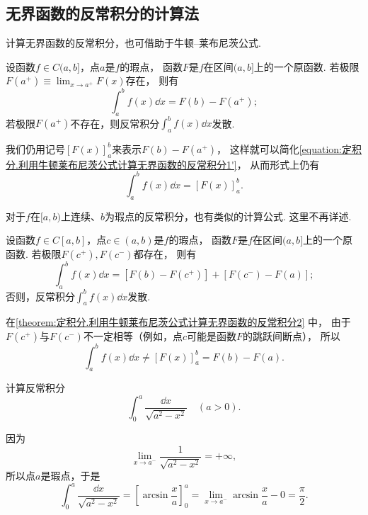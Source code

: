 \subsection{无界函数的反常积分的计算法}
计算无界函数的反常积分，也可借助于牛顿--莱布尼茨公式.
\begin{theorem}\label{theorem:定积分.利用牛顿莱布尼茨公式计算无界函数的反常积分1}
设函数\(f \in C(a,b]\)，点\(a\)是\(f\)的瑕点，
函数\(F\)是\(f\)在区间\((a,b]\)上的一个原函数.
若极限\(F(a^+) \equiv \lim_{x \to a^+} F(x)\)存在，
则有
\begin{equation}\label{equation:定积分.利用牛顿莱布尼茨公式计算无界函数的反常积分1'}
\int_a^b f(x) \dd{x}
= F(b) - F(a^+);
\end{equation}
若极限\(F(a^+)\)不存在，则反常积分\(\int_a^b f(x) \dd{x}\)发散.
\end{theorem}
我们仍用记号\([F(x)]_a^b\)来表示\(F(b) - F(a^+)\)，
这样就可以简化\cref{equation:定积分.利用牛顿莱布尼茨公式计算无界函数的反常积分1'}，
从而形式上仍有
\begin{equation}\label{equation:定积分.利用牛顿莱布尼茨公式计算无界函数的反常积分1}
\int_a^b f(x) \dd{x} = [F(x)]_a^b.
\end{equation}

对于\(f\)在\([a,b)\)上连续、\(b\)为瑕点的反常积分，也有类似的计算公式.
这里不再详述.

\begin{theorem}\label{theorem:定积分.利用牛顿莱布尼茨公式计算无界函数的反常积分2}
设函数\(f \in C[a,b]\)，点\(c\in(a,b)\)是\(f\)的瑕点，
函数\(F\)是\(f\)在区间\((a,b]\)上的一个原函数.
若极限\(F(c^+),F(c^-)\)都存在，
则有
\begin{equation}\label{equation:定积分.利用牛顿莱布尼茨公式计算无界函数的反常积分2}
\int_a^b f(x) \dd{x}
= [F(b) - F(c^+)] + [F(c^-) - F(a)];
\end{equation}
否则，反常积分\(\int_a^b f(x) \dd{x}\)发散.
\end{theorem}
在\cref{theorem:定积分.利用牛顿莱布尼茨公式计算无界函数的反常积分2} 中，
由于\(F(c^+)\)与\(F(c^-)\)不一定相等（例如，点\(c\)可能是函数\(F\)的跳跃间断点），
所以\[
\int_a^b f(x) \dd{x}
\neq [F(x)]_a^b = F(b) - F(a).
\]

\begin{example}
计算反常积分\[
\int_0^a \frac{\dd{x}}{\sqrt{a^2-x^2}}\quad(a>0).
\]
\begin{solution}
因为\[
\lim_{x \to a^-} \frac{1}{\sqrt{a^2-x^2}} = +\infty,
\]所以点\(a\)是瑕点，于是\[
\int_0^a \frac{\dd{x}}{\sqrt{a^2-x^2}}
= \left[ \arcsin\frac{x}{a} \right]_0^a
= \lim_{x \to a^-} \arcsin\frac{x}{a} - 0 = \frac{\pi}{2}.
\]
\end{solution}
\end{example}

